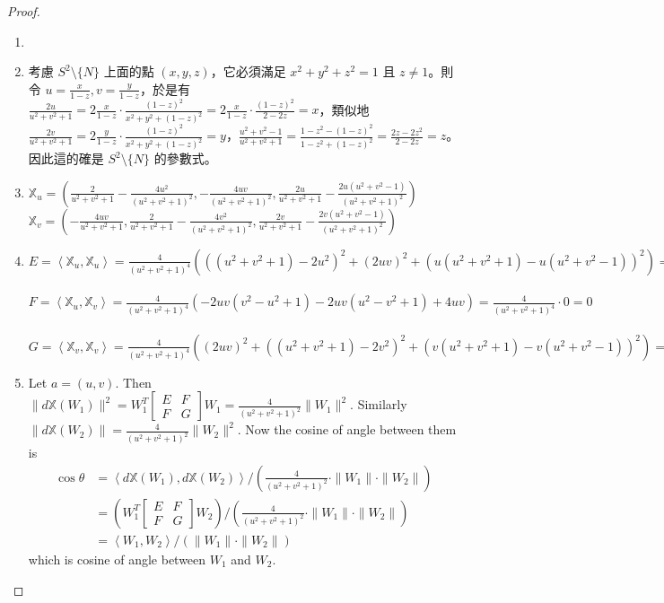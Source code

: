 \documentclass[10pt,a4paper]{article}
\begin{document}
\begin{proof}
\begin{enumerate}
\item[]
\item[(a)] 考慮 $S^2\setminus \{N\}$ 上面的點 $(x, y, z)$，它必須滿足 $x^2+y^2+z^2=1$ 且 $z\ne 1$。則令 $u=\frac{x}{1-z}, v=\frac{y}{1-z}$，於是有 $\frac{2u}{u^2+v^2+1}=2\frac{x}{1-z}\cdot\frac{(1-z)^2}{x^2+y^2+(1-z)^2} = 2\frac{x}{1-z}\cdot\frac{(1-z)^2}{2-2z} = x$，類似地 $\frac{2v}{u^2+v^2+1}=2\frac{y}{1-z}\cdot\frac{(1-z)^2}{x^2+y^2+(1-z)^2}=y$，$\frac{u^2+v^2-1}{u^2+v^2+1}=\frac{1-z^2-(1-z)^2}{1-z^2+(1-z)^2} = \frac{2z-2z^2}{2-2z} = z$。因此這的確是 $S^2\setminus\{N\}$ 的參數式。
\item[(c)]
$
\mathbb{X}_u = \left(
\frac{2}{u^2+v^2+1}-\frac{4u^2}{(u^2+v^2+1)^2},
-\frac{4uv}{(u^2+v^2+1)^2},
\frac{2u}{u^2+v^2+1}-\frac{2u(u^2+v^2-1)}{(u^2+v^2+1)^2}
\right)
$\\
$
\mathbb{X}_v = \left(
-\frac{4uv}{u^2+v^2+1},
\frac{2}{u^2+v^2+1}-\frac{4v^2}{(u^2+v^2+1)^2},
\frac{2v}{u^2+v^2+1}-\frac{2v(u^2+v^2-1)}{(u^2+v^2+1)^2}
\right)
$
 \item[(b)] 
$
E=\left\langle \mathbb{X}_u, \mathbb{X}_u
\right\rangle = \frac{4}{(u^2+v^2+1)^4}(((u^2+v^2+1)-2u^2)^2 + (2uv)^2 + (u(u^2+v^2+1) - u(u^2+v^2-1))^2) = \frac{4}{(u^2+v^2+1)^4}((v^2-u^2+1)^2+4u^2v^2+4u^2) = \frac{4}{(u^2+v^2+1)^2}
$\\
\\
$
F=\left\langle \mathbb{X}_u, \mathbb{X}_v
\right\rangle = \frac{4}{(u^2+v^2+1)^4}
(-2uv(v^2-u^2+1) -2uv(u^2-v^2+1) + 4uv)
= \frac{4}{(u^2+v^2+1)^4}\cdot 0 = 0
$\\
\\
$
G=\left\langle \mathbb{X}_v, \mathbb{X}_v
\right\rangle = \frac{4}{(u^2+v^2+1)^4}
((2uv)^2 + ((u^2+v^2+1)-2v^2)^2 + (v(u^2+v^2+1)-v(u^2+v^2-1))^2)
=\frac{4}{(u^2+v^2+1)^4}((u^2-v^2+1)^2+4u^2v^2+4v^2) = \frac{4}{(u^2+v^2+1)^2} = E$

\item[(d)]
Let $a=(u, v)$. Then $\|d\mathbb{X}(W_1)\|^2=W_1^T
\left[\begin{array}{cc} E & F \\ F & G \end{array}\right] W_1
= \frac{4}{(u^2+v^2+1)^2} \|W_1\|^2$. Similarly $\|d\mathbb{X}(W_2)\| = \frac{4}{(u^2+v^2+1)^2}  \|W_2\|^2$. Now the cosine of angle between them is 
\begin{align*}
\cos\theta &= \left\langle d\mathbb{X}(W_1), d\mathbb{X}(W_2)\right\rangle/(\frac{4}{(u^2+v^2+1)^2}\cdot\|W_1\|\cdot\|W_2\|) \\
&= \left( 
W_1^T\left[\begin{array}{cc} E & F \\ F & G\end{array}
\right] W_2\right) /
\left(\frac{4}{(u^2+v^2+1)^2}\cdot\|W_1\|\cdot\|W_2\|\right)
\\
&= \left\langle W_1, W_2\right\rangle / (\|W_1\|\cdot\|W_2\|)
\end{align*}
which is cosine of angle between $W_1$ and $W_2$.
\end{enumerate}
\end{proof}
\end{document}
